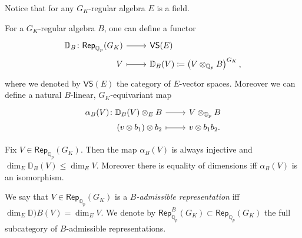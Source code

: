 \begin{rem}[]
	Notice that for any $G_K$-regular algebra $E$ is a field.
\end{rem}


\begin{defn}[]
	For a $G_K$-regular algebra $B$, one can define a
	functor
	\begin{equation*}
	\begin{tikzcd}[row sep = 0ex
		,/tikz/column 1/.append style={anchor=base east}
		,/tikz/column 2/.append style={anchor=base west}]
		\mathbb{D}_B\colon \mathsf{Rep}_{\mathbb{Q}_p}(G_K) \arrow[r, "", rightarrow] &
		\mathsf{VS}(E) \\
		V \arrow[r, "", mapsto] & 
		\mathbb{D}_B(V) \coloneqq \left( V \otimes_{\mathbb{Q}_p} B \right)^{G_K}
	,\end{tikzcd}
	\end{equation*} 
	where we denoted by $\mathsf{VS}(E)$ the category of $E$-vector spaces.
	Moreover we can define a natural $B$-linear, $G_K$-equivariant map
	\begin{equation*}
	\begin{tikzcd}[row sep = 0ex
		,/tikz/column 1/.append style={anchor=base east}
		,/tikz/column 2/.append style={anchor=base west}]
		\alpha_B(V)\colon 
		\mathbb{D}_B(V) \otimes_E B\arrow[r, "", rightarrow] &
		V \otimes_{\mathbb{Q}_p} B \\
		\left( v \otimes b_1 \right) \otimes b_2 \arrow[r, "", mapsto] & 
		v \otimes b_1b_2
	.\end{tikzcd}
	\end{equation*}
\end{defn}


\begin{prop}
	Fix $V \in \mathsf{Rep}_{\mathbb{Q}_p}(G_K)$.
	Then the map $\alpha_B(V)$ is always injective and
	$\dim_E \mathbb{D}_B(V) \leq \dim_E V$.
	Moreover there is equality of dimensions iff $\alpha_B(V)$ is an isomorphism.
\end{prop}


\begin{defn}
	We say that $V \in \mathsf{Rep}_{\mathbb{Q}_p}(G_K)$ is a
	{\em $B$-admissible representation} iff 
	$\dim_E \mathbb{D})B(V) = \dim_E V$.
	We denote by $\mathsf{Rep}_{\mathbb{Q}_p}^B(G_K) \subset \mathsf{Rep}_{\mathbb{Q}_p}(G_K)$
	the full subcategory of $B$-admissible representations.
\end{defn}


